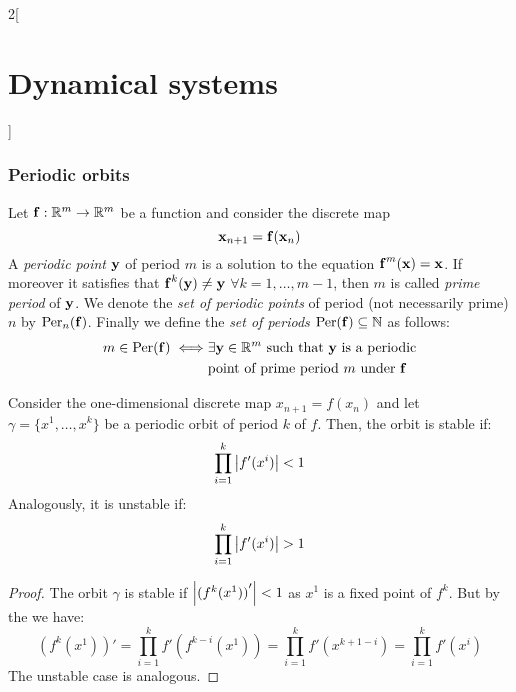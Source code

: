 \documentclass[../../../main_math.tex]{subfiles}
\begin{document}
\begin{multicols}{2}[\section{Dynamical systems}]
  \subsubsection{Periodic orbits}
  \begin{definition}
    Let $\boldsymbol{\mathrm{f}}:\mathbb{R}^m\rightarrow\mathbb{R}^m$ be a function and consider the discrete map
    \begin{equation}\label{DS:po_discrets}
      \boldsymbol{\mathrm{x}}_{n+1}=\boldsymbol{\mathrm{f}}(\boldsymbol{\mathrm{x}}_n)
    \end{equation} A \emph{periodic point} $\boldsymbol{\mathrm{y}}$ of period $m$ is a solution to the equation $\boldsymbol{\mathrm{f}}^m(\boldsymbol{\mathrm{x}})=\boldsymbol{\mathrm{x}}$. If moreover it satisfies that $\boldsymbol{\mathrm{f}}^k(\boldsymbol{\mathrm{y}})\ne\boldsymbol{\mathrm{y}}$ $\forall k=1,\ldots,m-1$, then $m$ is called \emph{prime period} of $\boldsymbol{\mathrm{y}}$. We denote the \emph{set of periodic points} of period (not necessarily prime) $n$ by $\operatorname{Per}_n(\boldsymbol{\mathrm{f}})$. Finally we define the \emph{set of periods} $\operatorname{Per}(\boldsymbol{\mathrm{f}})\subseteq\mathbb{N}$ as follows:
    \begin{align*}
      m\in\operatorname{Per}(\boldsymbol{\mathrm{f}})\iff & \exists\boldsymbol{\mathrm{y}}\in\mathbb{R}^m\text{ such that $\boldsymbol{\mathrm{y}}$ is a periodic} \\
                           & \text{point of prime period $m$ under $\boldsymbol{\mathrm{f}}$}
    \end{align*}
  \end{definition}
  \begin{proposition}
    Consider the one-dimensional discrete map $x_{n+1}=f(x_n)$ and let $\gamma=\{x^1,\ldots,x^k\}$ be a periodic orbit of period $k$ of $f$. Then, the orbit is stable if: $$\prod_{i=1}^k\abs{f'(x^i)}<1$$ Analogously, it is unstable if: $$\prod_{i=1}^k\abs{f'(x^i)}>1$$
  \end{proposition}
  \begin{proof}
    The orbit $\gamma$ is stable if $\abs{{(f^k(x^1))}'}<1$ as $x^1$ is a fixed point of $f^k$. But by the  we have:
    $$(f^k(x^1))'=\prod_{i=1}^kf'(f^{k-i}(x^1))=\prod_{i=1}^kf'(x^{k+1-i})=\prod_{i=1}^kf'(x^i)$$
    The unstable case is analogous.
  \end{proof}

\end{multicols}
\end{document}
